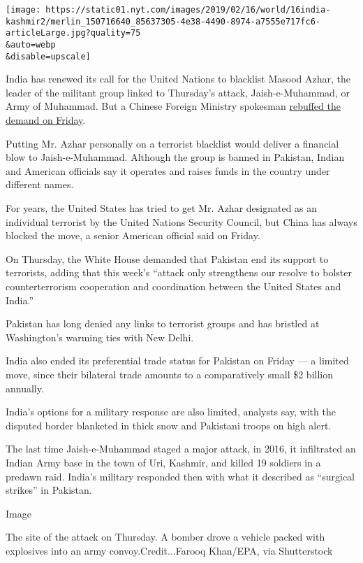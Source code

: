 \texttt{[image: https://static01.nyt.com/images/2019/02/16/world/16india-kashmir2/merlin\_150716640\_85637305-4e38-4490-8974-a7555e717fc6-articleLarge.jpg?quality=75\\\&auto=webp\\\&disable=upscale]}

India has renewed its call for the United Nations to blacklist Masood
Azhar, the leader of the militant group linked to Thursday's attack,
Jaish-e-Muhammad, or Army of Muhammad. But a Chinese Foreign Ministry
spokesman
\href{https://timesofindia.indiatimes.com/india/china-again-says-no-to-back-indias-bid-to-list-jem-chief-masood-azhar-as-global-terrorist-by-un/articleshow/68005554.cms}{rebuffed
the demand on Friday}.

Putting Mr. Azhar personally on a terrorist blacklist would deliver a
financial blow to Jaish-e-Muhammad. Although the group is banned in
Pakistan, Indian and American officials say it operates and raises funds
in the country under different names.

For years, the United States has tried to get Mr. Azhar designated as an
individual terrorist by the United Nations Security Council, but China
has always blocked the move, a senior American official said on Friday.

On Thursday, the White House demanded that Pakistan end its support to
terrorists, adding that this week's ``attack only strengthens our
resolve to bolster counterterrorism cooperation and coordination between
the United States and India.''

Pakistan has long denied any links to terrorist groups and has bristled
at Washington's warming ties with New Delhi.

India also ended its preferential trade status for Pakistan on Friday
--- a limited move, since their bilateral trade amounts to a
comparatively small \$2 billion annually.

India's options for a military response are also limited, analysts say,
with the disputed border blanketed in thick snow and Pakistani troops on
high alert.

The last time Jaish-e-Muhammad staged a major attack, in 2016, it
infiltrated an Indian Army base in the town of Uri, Kashmir, and killed
19 soldiers in a predawn raid. India's military responded then with what
it described as ``surgical strikes'' in Pakistan.

Image

The site of the attack on Thursday. A bomber drove a vehicle packed with
explosives into an army convoy.Credit...Farooq Khan/EPA, via
Shutterstock

